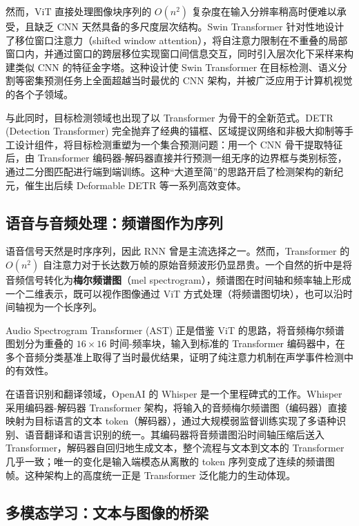 然而，ViT 直接处理图像块序列的 $O(n^2)$ 复杂度在输入分辨率稍高时便难以承受，且缺乏 CNN 天然具备的多尺度层次结构。Swin Transformer\cite{liu2021swin} 针对性地设计了移位窗口注意力（shifted window attention），将自注意力限制在不重叠的局部窗口内，并通过窗口的跨层移位实现窗口间信息交互，同时引入层次化下采样来构建类似 CNN 的特征金字塔。这种设计使 Swin Transformer 在目标检测、语义分割等密集预测任务上全面超越当时最优的 CNN 架构，并被广泛应用于计算机视觉的各个子领域。

与此同时，目标检测领域也出现了以 Transformer 为骨干的全新范式。DETR (Detection Transformer)\cite{carion2020endtoendobjectdetectiontransformers} 完全抛弃了经典的锚框、区域提议网络和非极大抑制等手工设计组件，将目标检测重塑为一个集合预测问题：用一个 CNN 骨干提取特征后，由 Transformer 编码器-解码器直接并行预测一组无序的边界框与类别标签，通过二分图匹配进行端到端训练。这种“大道至简”的思路开启了检测架构的新纪元，催生出后续 Deformable DETR\cite{zhu2021deformable} 等一系列高效变体。

\subsection{语音与音频处理：频谱图作为序列}

语音信号天然是时序序列，因此 RNN 曾是主流选择之一。然而，Transformer 的 $O(n^2)$ 自注意力对于长达数万帧的原始音频波形仍显昂贵。一个自然的折中是将音频信号转化为\textbf{梅尔频谱图}（mel spectrogram），频谱图在时间轴和频率轴上形成一个二维表示，既可以视作图像通过 ViT 方式处理（将频谱图切块），也可以沿时间轴视为一个长序列。

Audio Spectrogram Transformer (AST)\cite{gong2021ast} 正是借鉴 ViT 的思路，将音频梅尔频谱图划分为重叠的 $16\times16$ 时间-频率块，输入到标准的 Transformer 编码器中，在多个音频分类基准上取得了当时最优结果，证明了纯注意力机制在声学事件检测中的有效性。

在语音识别和翻译领域，OpenAI 的 Whisper\cite{radford2023robust} 是一个里程碑式的工作。Whisper 采用编码器-解码器 Transformer 架构，将输入的音频梅尔频谱图（编码器）直接映射为目标语言的文本 token（解码器），通过大规模弱监督训练实现了多语种识别、语音翻译和语言识别的统一。其编码器将音频谱图沿时间轴压缩后送入 Transformer，解码器自回归地生成文本，整个流程与文本到文本的 Transformer 几乎一致；唯一的变化是输入端模态从离散的 token 序列变成了连续的频谱图帧。这种架构上的高度统一正是 Transformer 泛化能力的生动体现。

\subsection{多模态学习：文本与图像的桥梁}

